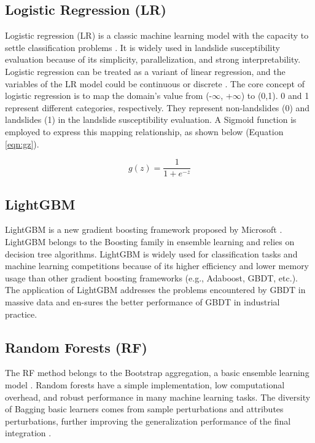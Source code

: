 \documentclass[a4paper,fleqn]{cas-sc}
\begin{document}
\subsection{Logistic Regression (LR)}

Logistic regression (LR) is a classic machine learning model with the capacity to settle classification problems \citep{Ayalew2005Geomorphology,Bai2010Geomorphology,Song2018}. 
It is widely used in landslide susceptibility evaluation because of its simplicity, parallelization, and strong interpretability. 
Logistic regression can be treated as a variant of linear regression, and the variables of the LR model could be continuous or discrete \citep{Ayalew2005Geomorphology,Bai2010Geomorphology}. 
The core concept of logistic regression is to map the domain's value from (-$\infty$, +$\infty$) to (0,1). 
0 and 1 represent different categories, respectively. 
They represent non-landslides (0) and landslides (1) in the landslide susceptibility evaluation. 
A Sigmoid function is employed to express this mapping relationship, as shown below (Equation \ref{eqn:gz}).

\begin{equation}
  g(z)=\frac{1}{1+e^{-z}}
  \label{eqn:gz}
\end{equation}

\subsection{LightGBM}

LightGBM is a new gradient boosting framework proposed by Microsoft \citep{Friedman2002_GBoost}. 
LightGBM belongs to the Boosting family in ensemble learning and relies on decision tree algorithms. 
LightGBM is widely used for classification tasks and machine learning competitions because of its higher efficiency and lower memory usage than other gradient boosting frameworks (e.g., Adaboost, GBDT, etc.). 
The application of LightGBM addresses the problems encountered by GBDT in massive data and en-sures the better performance of GBDT in industrial practice.

\subsection{Random Forests (RF)}

The RF method belongs to the Bootstrap aggregation, a basic ensemble learning model \citep{Breiman2001}. 
Random forests have a simple implementation, low computational overhead, and robust performance in many machine learning tasks. 
The diversity of Bagging basic learners comes from sample perturbations and attributes perturbations, further improving the generalization performance of the final integration \citep{Youssef2015Landslides}. 
\end{document}
